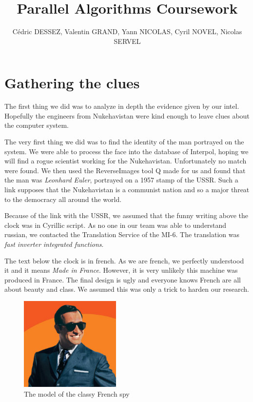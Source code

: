 \documentclass[11pt,a4paper]{article}
\begin{document}
\title{Parallel Algorithms Coursework}
\author{C\'edric DESSEZ, Valentin GRAND, Yann NICOLAS, Cyril NOVEL, Nicolas SERVEL}
\maketitle

\section{Gathering the clues}
The first thing we did was to analyze in depth the evidence given by our intel. Hopefully the engineers from Nukehavistan were kind enough to leave clues about the computer system.

The very first thing we did was to find the identity of the man portrayed on the system. We were able to process the face into the database of Interpol, hoping we will find a rogue scientist working for the Nukehavistan. Unfortunately no match were found. We then used the ReverseImages tool Q made for us and found that the man was \textit{Leonhard Euler}, portrayed on a 1957 stamp of the USSR. Such a link supposes that the Nukehavistan is a communist nation and so a major threat to the democracy all around the world.

Because of the link with the USSR, we assumed that the funny writing above the clock was in Cyrillic script. As no one in our team was able to understand russian, we contacted the Translation Service of the MI-6. The translation was \textit{fast inverter integrated functions}.

The text below the clock is in french. As we are french, we perfectly understood it and it means \textit{Made in France}. However, it is very unlikely this machine was produced in France. The final design is ugly and everyone knows French are all about beauty and class. We assumed this was only a trick to harden our research.

\begin{figure}[!h]
\centering
\includegraphics[width=5cm]{oss.png}
\caption{The model of the classy French spy}
\label{frenchspy}
\end{figure}
\end{document}
